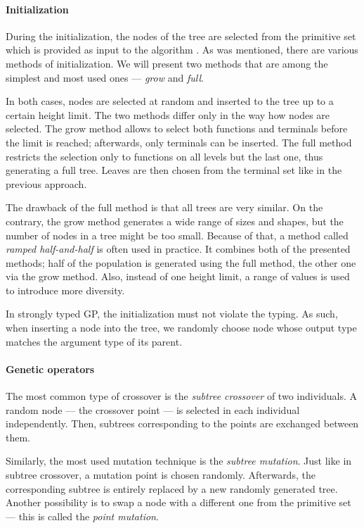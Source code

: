 \paragraph{Initialization} \label{sec:gp:init}
During the initialization, the nodes of the tree are selected from the
primitive set which is provided as input to the algorithm
\citep{Koza:1992:GPP:138936}. As was mentioned, there are various methods of 
initialization. We will present two methods that are among the simplest and 
most used ones --- \emph{grow} and \emph{full}.

In both cases, nodes are selected at random and inserted to the tree up to a
certain height limit. The two methods differ only in the way how nodes are
selected. The grow method allows to select both functions and terminals
before the limit is reached; afterwards, only terminals can be inserted. The
full method restricts the selection only to functions on all levels but the
last one, thus generating a full tree. Leaves are then chosen from the terminal
set like in the previous approach.

The drawback of the full method is that all trees are very similar. On the
contrary, the grow method generates a wide range of sizes and shapes, but the
number of nodes in a tree might be too small. Because of that, a method called
\emph{ramped half-and-half} is often used in practice. It combines both 
of the presented methods; half of the population is generated using the full
method, the other one via the grow method. Also, instead of one height limit, a
range of values is used to introduce more diversity.
\citep{Poli:2008:FGG:1796422}

In strongly typed GP, the initialization must not violate the typing. As such,
when inserting a node into the tree, we randomly choose node whose output type
matches the argument type of its parent.

\paragraph{Genetic operators} \label{treeops}
The most common type of crossover is the \emph{subtree crossover} of two
individuals. A random node --- the crossover point ---
is selected in each individual independently. Then, subtrees corresponding
to the points are exchanged between them.

Similarly, the most used mutation technique is the \emph{subtree mutation}.
Just like in subtree crossover, a mutation point is chosen randomly.
Afterwards, the corresponding subtree is entirely replaced by a new randomly
generated tree. Another possibility is to swap a node with a different one
from the primitive set --- this is called the \emph{point mutation}.

